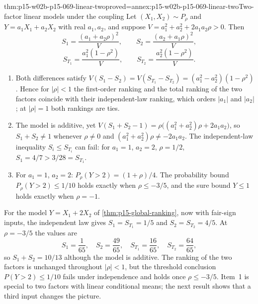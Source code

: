 \begin{hbtheorem}{thm:p15-w02b-p15-069-linear-two}{proved=annex:p15-w02b-p15-069-linear-two}{Two-factor linear models under the coupling}
Let \((X_1,X_2)\sim P_\rho\) and \(Y=a_1X_1+a_2X_2\) with real
\(a_1,a_2\), and suppose
\(V=a_1^2+a_2^2+2a_1a_2\rho>0\). Then
\[
 S_1=\frac{(a_1+a_2\rho)^2}{V},\qquad
 S_2=\frac{(a_2+a_1\rho)^2}{V},
\]
\[
 S_{T_1}=\frac{a_1^2(1-\rho^2)}{V},\qquad
 S_{T_2}=\frac{a_2^2(1-\rho^2)}{V}.
\]
\begin{enumerate}
\item Both differences satisfy
 \(V(S_1-S_2)=V(S_{T_1}-S_{T_2})=(a_1^2-a_2^2)(1-\rho^2)\).
 Hence for \(|\rho|<1\) the first-order ranking and the total ranking of
 the two factors coincide with their independent-law ranking, which
 orders \(|a_1|\) and \(|a_2|\); at \(|\rho|=1\) both rankings are ties.
\item The model is additive, yet
 \(V(S_1+S_2-1)=\rho\bigl((a_1^2+a_2^2)\rho+2a_1a_2\bigr)\), so
 \(S_1+S_2\ne1\) whenever \(\rho\ne0\) and
 \((a_1^2+a_2^2)\rho\ne-2a_1a_2\). The independent-law inequality
 \(S_i\leq S_{T_i}\) can fail: for \(a_1=1\), \(a_2=2\), \(\rho=1/2\),
 \(S_1=4/7>3/28=S_{T_1}\).
\item For \(a_1=1\), \(a_2=2\): \(P_\rho(Y>2)=(1+\rho)/4\). The probability
 bound \(P_\rho(Y>2)\leq1/10\) holds exactly when \(\rho\leq-3/5\), and the
 sure bound \(Y\leq1\) holds exactly when \(\rho=-1\).
\end{enumerate}
\end{hbtheorem}

For the model \(Y=X_1+2X_2\) of \cref{thm:p15-global-ranking}, now with
fair-sign inputs, the independent law gives
\(S_1=S_{T_1}=1/5\) and \(S_2=S_{T_2}=4/5\). At \(\rho=-3/5\) the values are
\[
 S_1=\frac1{65},\quad S_2=\frac{49}{65},\quad
 S_{T_1}=\frac{16}{65},\quad S_{T_2}=\frac{64}{65},
\]
so \(S_1+S_2=10/13\) although the model is additive.
The ranking of the two factors is unchanged throughout \(|\rho|<1\),
but the threshold conclusion \(P(Y>2)\leq1/10\) fails under independence
and holds once \(\rho\leq-3/5\). Item~1 is special to two factors with
linear conditional means; the next result shows that a third input
changes the picture.

